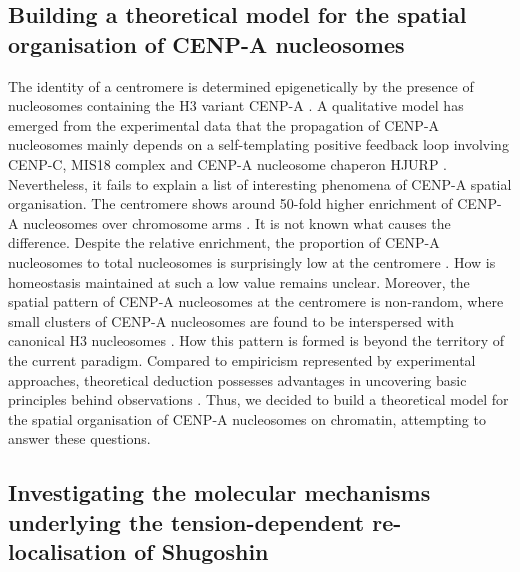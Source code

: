 \subsection{Building a theoretical model for the spatial organisation of CENP-A nucleosomes}

The identity of a centromere is determined epigenetically by the presence of nucleosomes containing the H3 variant CENP-A \citep{Warburton1997ImmunolocalizationCentromeres, Vafa1997ChromatinPlate, Earnshaw1985ThreeChromosome, Liu2006MappingCells, Regnier2005CENP-ABubR1, Heun2006, Mendiburo2011, Barnhart2011, Logsdon2015, Logsdon2019}. A qualitative model has emerged from the experimental data that the propagation of CENP-A nucleosomes mainly depends on a self-templating positive feedback loop involving CENP-C, MIS18 complex and CENP-A nucleosome chaperon HJURP \citep{McKinley2015, Stirpe2022}. Nevertheless, it fails to explain a list of interesting phenomena of CENP-A spatial organisation. The centromere shows around 50-fold higher enrichment of CENP-A nucleosomes over chromosome arms \citep{Bodor2014}. It is not known what causes the difference. Despite the relative enrichment, the proportion of CENP-A nucleosomes to total nucleosomes is surprisingly low at the centromere \citep{Bodor2014, Schittenhelm2010}. How is homeostasis maintained at such a low value remains unclear. Moreover, the spatial pattern of CENP-A nucleosomes at the centromere is non-random, where small clusters of CENP-A nucleosomes are found to be interspersed with canonical H3 nucleosomes \citep{Blower2002ConservedHumans, Dunleavy2011H3.3Phase., Kyriacou2018}. How this pattern is formed is beyond the territory of the current paradigm. Compared to empiricism represented by experimental approaches, theoretical deduction possesses advantages in uncovering basic principles behind observations \citep{Fidelman1985TheModeling}. Thus, we decided to build a theoretical model for the spatial organisation of CENP-A nucleosomes on chromatin, attempting to answer these questions. 

\subsection{Investigating the molecular mechanisms underlying the tension-dependent re-localisation of Shugoshin}

